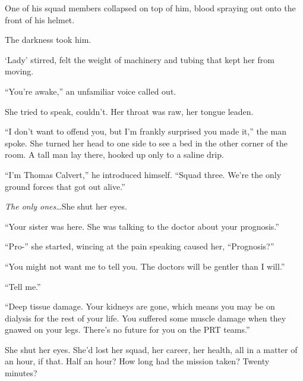 One of his squad members collapsed on top of him, blood spraying out onto the front of his helmet.



The darkness took him.



\blacksquare



`Lady' stirred, felt the weight of machinery and tubing that kept her from moving.



``You're awake,'' an unfamiliar voice called out.



She tried to speak, couldn't.  Her throat was raw, her tongue leaden.



``I don't want to offend you, but I'm frankly surprised you made it,'' the man spoke.  She turned her head to one side to see a bed in the other corner of the room.  A tall man lay there, hooked up only to a saline drip.



``I'm Thomas Calvert,'' he introduced himself.  ``Squad three.  We're the only ground forces that got out alive.''



\emph{The only ones}\ldots  She shut her eyes.



``Your sister was here.  She was talking to the doctor about your prognosis.''



``Pro-'' she started, wincing at the pain speaking caused her, ``Prognosis?''



``You might not want me to tell you.  The doctors will be gentler than I will.''



``Tell me.''



``Deep tissue damage.  Your kidneys are gone, which means you may be on dialysis for the rest of your life.  You suffered some muscle damage when they gnawed on your legs.  There's no future for you on the PRT teams.''



She shut her eyes.  She'd lost her squad, her career, her health, all in a matter of an hour, if that.  Half an hour?  How long had the mission taken?  Twenty minutes?




